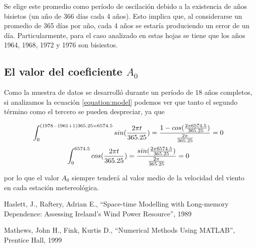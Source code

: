 \documentclass[journal, monochrome]{IEEEtran}
\begin{document}
Se elige este promedio como período de oscilación debido a la existencia de años bisietos (un año de 366 días cada 4 años). Esto implica que, al considerarse un
promedio de 365 días por año, cada 4 años se estaría produciendo un error de un día. Particularmente, para el caso
analizado en estas hojas se tiene que los años 1964, 1968, 1972 y 1976 son bisiestos.

\vspace{0.5cm}
\subsection{El valor del coeficiente $A_{0}$}

Como la muestra de datos se desarrolló durante un período de 18 años completos, si analizamos la ecuación \ref{equation:model} podemos ver que tanto el segundo término como el tercero se pueden despreciar, ya que

\begin{equation}
\int_0^{(1978-1961+1)365.25 = 6574.5} sin( \frac{2 \pi t}{365.25} )  = \frac{1-cos(\frac{2 \pi 6574.5}{365.25})}{ \frac{2 \pi }{365.25}} = 0 \\ 
\end{equation}
\begin{equation}
\int_0^{6574.5} cos( \frac{2 \pi t}{365.25} )  = \frac{sin(\frac{2 \pi 6574.5}{365.25})}{ \frac{2 \pi }{365.25}} = 0 \\ 
\end{equation}

por lo que el valor $A_{0}$ siempre tenderá al valor medio de la velocidad del viento en cada estación metereológica.



\vspace{1cm}
\begin{thebibliography}{1}
	Haslett, J.,
	Raftery, Adrian E.,
	``Space-time Modelling with
   	Long-memory Dependence: Assessing Ireland's Wind Power Resource'',
	1989 

	Mathews, John H.,
	Fink, Kurtis D.,
	``Numerical Methods Using MATLAB'',
	Prentice Hall,
	1999
	
\end{thebibliography}


\end{document}
